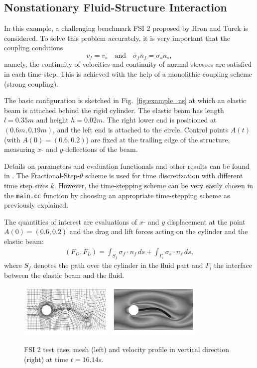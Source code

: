 \documentclass[smallextended]{svjour3}       %
\numberwithin{equation}{section}
\begin{document}
\subsection{Nonstationary Fluid-Structure Interaction}
In this example, a challenging benchmark FSI 2
proposed by Hron and Turek \cite{HrTu06b} is considered.
To solve this problem accurately, it is very important that 
the coupling conditions
\[
v_f = v_s \quad \text{and} \quad \sigma_f n_f = \sigma_s n_s, 
\]
namely, the continuity of velocities and continuity of normal stresses
are satisfied in each time-step. This is achieved with the help of 
a monolithic coupling scheme (strong coupling).

The basic configuration is 
sketched in Fig.~\ref{fig:example_ns} at which an elastic beam is attached 
behind the rigid cylinder. 
The elastic beam has length
$l=0.35m$ and height $h=0.02m$. The right lower end is positioned at 
$(0.6m,0.19m)$, and
the left end is attached to the circle. 
Control points $A(t)$ (with $A(0) = (0.6,0.2)$) are fixed at the 
trailing edge of the structure, measuring $x$- and $y$-deflections of the beam.

Details 
on parameters and evaluation functionals and other results 
can be found in \cite{HrTu06b,BuSc06,DeHaeAnnBrVie10,Wi11}. 
The Fractional-Step-$\theta$ scheme is used for time discretization with
different time step sizes $k$. However, the time-stepping scheme can be 
very easily chosen in the \texttt{main.cc} function by choosing an appropriate 
time-stepping scheme as previously explained.

The quantities of interest are evaluations of 
$x$- and $y$ displacement at the point $A(0) = (0.6,0.2)$
and the drag and lift forces acting on the cylinder and the elastic beam:
\begin{align}
\label{drag_lift_forces}
(F_D , F_L) 
= {\int_{S_f} \sigma_f \cdot n_f \, ds + 
\int_{\Gamma_i} \sigma_s \cdot n_s \, ds},
\end{align}
where $S_{f}$ denotes the path over the cylinder in the fluid part and
$\Gamma_i$ the interface between the elastic beam and the 
fluid.
\begin{figure}[h]
\centering
{\includegraphics[width=4.5cm]{Pictures/visit_fsi_2_CNn_t_2e-2_global_3_biharmonic_mesh8070_scale.png}}
{\includegraphics[width=4.5cm]{Pictures/visit_fsi_2_CNn_t_2e-2_global_3_biharmonic_x_velo8070_scale.png}}
\caption{FSI 2 test case: mesh (left) and velocity profile in vertical 
direction (right) at time $t=16.14s$.}
\label{res:fsi_2_mesh_and_x_velo}
\end{figure}
\end{document}
